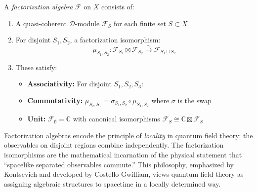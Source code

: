 \begin{definition}\label{def:fact-algebra-correct}
A \emph{factorization algebra} $\mathcal{F}$ on $X$ consists of:
\begin{enumerate}
\item A quasi-coherent $\mathcal{D}$-module $\mathcal{F}_S$ for each finite set $S \subset X$
\item For disjoint $S_1, S_2$, a factorization isomorphism:
   $$\mu_{S_1,S_2}: \mathcal{F}_{S_1} \boxtimes \mathcal{F}_{S_2} \xrightarrow{\sim} \mathcal{F}_{S_1 \sqcup S_2}$$
\item These satisfy:
   \begin{itemize}
   \item \textbf{Associativity:} For disjoint $S_1, S_2, S_3$:
   \begin{center}
   \end{center}
   \item \textbf{Commutativity:} $\mu_{S_2,S_1} = \sigma_{S_1,S_2} \circ \mu_{S_1,S_2}$ where $\sigma$ is the swap
   \item \textbf{Unit:} $\mathcal{F}_\emptyset = \mathbb{C}$ with canonical isomorphisms $\mathcal{F}_S \cong \mathbb{C} \boxtimes \mathcal{F}_S$
   \end{itemize}
\end{enumerate}
\end{definition}

\begin{remark}
Factorization algebras encode the principle of \emph{locality} in quantum field theory: the observables 
on disjoint regions combine independently. The factorization isomorphisms are the mathematical incarnation 
of the physical statement that ``spacelike separated observables commute.'' This philosophy, emphasized by 
Kontsevich and developed by Costello-Gwilliam, views quantum field theory as assigning algebraic structures 
to spacetime in a locally determined way.
\end{remark}

